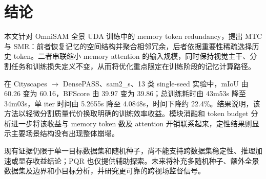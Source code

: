 \section{结论}
\label{sec:conclusion}

本文针对 OmniSAM 全景 UDA 训练中的 memory token redundancy，提出 MTC 与 SMR：前者恢复记忆的空间结构并聚合相邻冗余，后者依据重要性稀疏选择历史 token。二者串联缩小 memory attention 的输入规模，同时保持视觉主干、分割任务和训练损失定义不变，从而将优化重点限定在训练阶段的记忆计算路径。

在 Cityscapes $\rightarrow$ DensePASS、sam2\_s、13 类 single-seed 实验中，mIoU 由 60.26 变为 60.16，BFScore 由 39.97 变为 39.86；总训练耗时由 43m53s 降至 34m03s，单 iter 时间由 5.2655s 降至 4.0848s，时间下降约 22.4\%。结果说明，该方法以轻微分割质量代价换取明确的训练效率收益。模块消融和 token budget 分析进一步将该收益与 memory token 数及 attention 开销联系起来，定性结果则显示主要场景结构没有出现整体崩塌。

现有证据仍限于单一目标数据集和随机种子，尚不能支持跨数据集稳定性、推理加速或显存收益结论；PQR 也仅提供辅助探索。未来将补充多随机种子、额外全景数据集及边界和小目标分析，并研究更可靠的跨视场监督信号。
